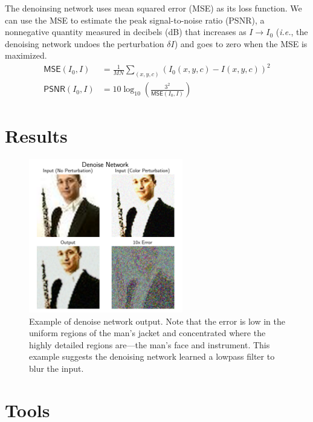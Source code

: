 \documentclass[justified]{article}
\begin{document}
  The denoinsing network uses mean squared error (MSE) as its loss function.
  We can use the MSE to estimate the peak signal-to-noise ratio (PSNR), a nonnegative quantity measured in decibels (dB) that increases as $I \to I_0$ (\textit{i.e.}, the denoising network undoes the perturbation $\delta I$) and goes to zero when the MSE is maximized.
  \begin{equation}
    \begin{split}
      \mathsf{MSE}(I_0, I) &= \frac{1}{MN} \sum_{(x, y, c)} \left(I_0(x, y, c) - I(x, y, c)\right)^2 \\
      \mathsf{PSNR}(I_0, I) &= 10 \log_{10} \left(\frac{3^2}{\mathsf{MSE}(I_0, I)}\right)
    \end{split}
  \end{equation}


  \section{Results}

  \begin{figure}[H]
    \centering
    \includegraphics[width=0.6\textwidth]{figures/denoise.png}
    \caption{
      Example of denoise network output.
      Note that the error is low in the uniform regions of the man's jacket and concentrated where the highly detailed regions are---the man's face and instrument.
      This example suggests the denoising network learned a lowpass filter to blur the input.
    }
  \end{figure}

  \section{Tools}
\end{document}
